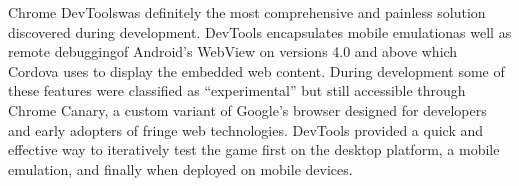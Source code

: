 \documentclass[final]{cmpreport}
\begin{document}
Chrome DevTools\footnotemark was definitely the most comprehensive and painless solution discovered during development. DevTools encapsulates mobile emulation\footnotemark as well as remote debugging\footnotemark of Android's WebView on versions 4.0 and above which Cordova uses to display the embedded web content. During development some of these features were classified as ``experimental'' but still accessible through Chrome Canary\footnotemark, a custom variant of Google's browser designed for developers and early adopters of fringe web technologies. DevTools provided a quick and effective way to iteratively test the game first on the desktop platform, a mobile emulation, and finally when deployed on mobile devices.


\clearpage

\end{document}
